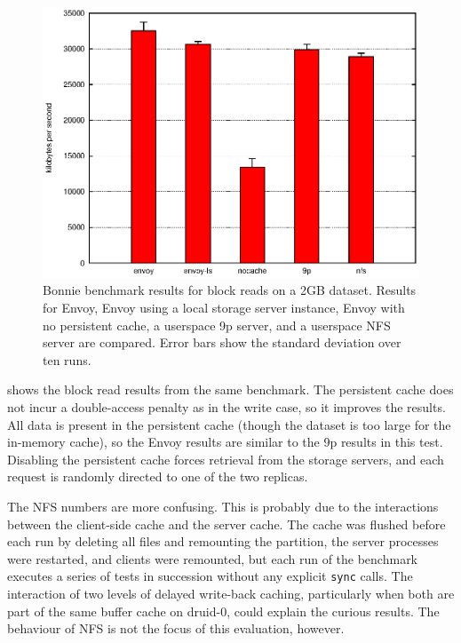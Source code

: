\begin{figure}[t]
\centering
\includegraphics[width=\figwidth]{figures/bonnie-druid1-read}
\caption[Bonnie benchmark results for block reads]{Bonnie benchmark results for block reads on a 2GB dataset. Results for Envoy, Envoy using a local storage server instance, Envoy with no persistent cache, a userspace 9p server, and a userspace NFS server are compared. Error bars show the standard deviation over ten runs.}
\label{fig:bonnie-druid1-read}
\end{figure}

 shows the block read results from the same benchmark. The persistent cache does not incur a double-access penalty as in the write case, so it improves the results. All data is present in the persistent cache (though the dataset is too large for the in-memory cache), so the Envoy results are similar to the 9p results in this test. Disabling the persistent cache forces retrieval from the storage servers, and each request is randomly directed to one of the two replicas.

The NFS numbers are more confusing. This is probably due to the interactions between the client-side cache and the server cache. The cache was flushed before each run by deleting all files and remounting the partition, the server processes were restarted, and clients were remounted, but each run of the benchmark executes a series of tests in succession without any explicit \texttt{sync} calls. The interaction of two levels of delayed write-back caching, particularly when both are part of the same buffer cache on druid-0, could explain the curious results. The behaviour of NFS is not the focus of this evaluation, however.

